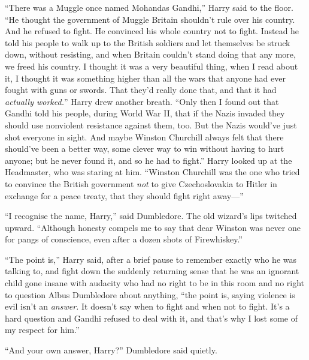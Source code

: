 ``There was a Muggle once named Mohandas Gandhi,'' Harry said to the
floor. ``He thought the government of Muggle Britain shouldn't rule over
his country. And he refused to fight. He convinced his whole country not
to fight. Instead he told his people to walk up to the British soldiers
and let themselves be struck down, without resisting, and when Britain
couldn't stand doing that any more, we freed his country. I thought it
was a very beautiful thing, when I read about it, I thought it was
something higher than all the wars that anyone had ever fought with guns
or swords. That they'd really done that, and that it had \emph{actually
worked.}'' Harry drew another breath. ``Only then I found out that
Gandhi told his people, during World War II, that if the Nazis invaded
they should use nonviolent resistance against them, too. But the Nazis
would've just shot everyone in sight. And maybe Winston Churchill always
felt that there should've been a better way, some clever way to win
without having to hurt anyone; but he never found it, and so he had to
fight.'' Harry looked up at the Headmaster, who was staring at him.
``Winston Churchill was the one who tried to convince the British
government \emph{not} to give Czechoslovakia to Hitler in exchange for a
peace treaty, that they should fight right away---''

``I recognise the name, Harry,'' said Dumbledore. The old wizard's lips
twitched upward. ``Although honesty compels me to say that dear Winston
was never one for pangs of conscience, even after a dozen shots of
Firewhiskey.''

``The point is,'' Harry said, after a brief pause to remember exactly
who he was talking to, and fight down the suddenly returning sense that
he was an ignorant child gone insane with audacity who had no right to
be in this room and no right to question Albus Dumbledore about
anything, ``the point is, saying violence is evil isn't an
\emph{answer.} It doesn't say when to fight and when not to fight. It's
a hard question and Gandhi refused to deal with it, and that's why I
lost some of my respect for him.''

``And your own answer, Harry?'' Dumbledore said quietly.

